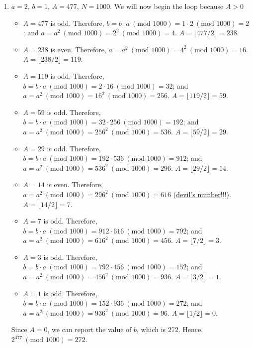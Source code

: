 {\begin{enumerate}
\begin{itemize}
            \item $A = 1$ is odd. Therefore, $b = b \cdot a \ (\text{mod } 256) = 113 \cdot 1 \ (\text{mod } 256) = 113$; and $a = a^2 \ (\text{mod } 256) = 1^2 \ (\text{mod 256}) = 1$. $A = \lfloor 1 / 2 \rfloor = 0$.
        \end{itemize}
        Since $A = 0$, we can report the value of $b$, which is $113$. Hence, $17^183 \ (\text{mod }256) = 113$.
        \item $a = 2$, $b = 1$, $A = 477$, $N = 1000$. We will now begin the loop because $A > 0$
        \begin{itemize}
            \item $A = 477$ is odd. Therefore, $b = b \cdot a \ (\text{mod } 1000) = 1 \cdot 2 \ (\text{mod } 1000) = 2$; and $a = a^2 \ (\text{mod } 1000) = 2^2 \ (\text{mod } 1000) = 4$. $A = \lfloor 477 / 2 \rfloor = 238$.
            \item $A = 238$ is even. Therefore, $a = a^2 \ (\text{mod } 1000) = 4^2 \ (\text{mod } 1000) = 16$. $A = \lfloor 238 / 2 \rfloor = 119$.
            \item $A = 119$ is odd. Therefore, $b = b \cdot a \ (\text{mod } 1000) = 2 \cdot 16 \ (\text{mod } 1000) = 32$; and $a = a^2 \ (\text{mod } 1000) = 16^2 \ (\text{mod } 1000) = 256$. $A = \lfloor 119 / 2 \rfloor = 59$.
            \item $A = 59$ is odd. Therefore, $b = b \cdot a \ (\text{mod } 1000) = 32 \cdot 256 \ (\text{mod } 1000) = 192$; and $a = a^2 \ (\text{mod } 1000) = 256^2 \ (\text{mod } 1000) = 536$. $A = \lfloor 59 / 2 \rfloor = 29$.
            \item $A = 29$ is odd. Therefore, $b = b \cdot a \ (\text{mod } 1000) = 192 \cdot 536 \ (\text{mod } 1000) = 912$; and $a = a^2 \ (\text{mod } 1000) = 536^2 \ (\text{mod } 1000) = 296$. $A = \lfloor 29 / 2 \rfloor = 14$.
            \item $A = 14$ is even. Therefore, $a = a^2 \ (\text{mod } 1000) = 296^2 \ (\text{mod } 1000) = 616$ (\href{https://en.wikipedia.org/wiki/616_(number)}{devil's number}!!!). $A = \lfloor 14 / 2 \rfloor = 7$.
            \item $A = 7$ is odd. Therefore, $b = b \cdot a \ (\text{mod } 1000) = 912 \cdot 616 \ (\text{mod } 1000) = 792$; and $a = a^2 \ (\text{mod } 1000) = 616^2 \ (\text{mod } 1000) = 456$. $A = \lfloor 7 / 2 \rfloor = 3$.
            \item $A = 3$ is odd. Therefore, $b = b \cdot a \ (\text{mod } 1000) = 792 \cdot 456 \ (\text{mod } 1000) = 152$; and $a = a^2 \ (\text{mod } 1000) = 456^2 \ (\text{mod } 1000) = 936$. $A = \lfloor 3 / 2 \rfloor = 1$.
            \item $A = 1$ is odd. Therefore, $b = b \cdot a \ (\text{mod } 1000) = 152 \cdot 936 \ (\text{mod } 1000) = 272$; and $a = a^2 \ (\text{mod } 1000) = 936^2 \ (\text{mod } 1000) = 96$. $A = \lfloor 1 / 2 \rfloor = 0$.
        \end{itemize}
        Since $A = 0$, we can report the value of $b$, which is $272$. Hence, $2^477 \ (\text{mod }1000) = 272$.
    \end{enumerate}
}

